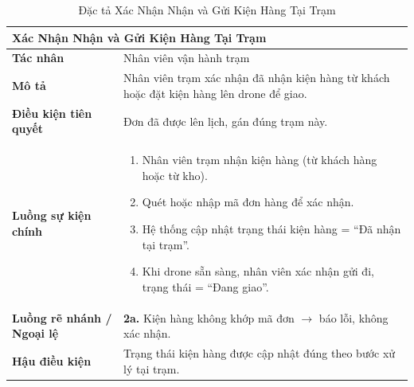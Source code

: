 \begin{table}[H]
  \centering
  \begin{tabularx}{\textwidth}{|l|X|}
    \hline
    \multicolumn{2}{|l|}{\textbf{Xác Nhận Nhận và Gửi Kiện Hàng Tại Trạm}} \\
    \hline
    \textbf{Tác nhân}           & Nhân viên vận hành trạm \\ \hline
    \textbf{Mô tả}              & Nhân viên trạm xác nhận đã nhận kiện hàng từ khách hoặc đặt kiện hàng lên drone để giao. \\ \hline
    \textbf{Điều kiện tiên quyết} & Đơn đã được lên lịch, gán đúng trạm này. \\ \hline
    \textbf{Luồng sự kiện chính} &
      \begin{enumerate}[leftmargin=*, nosep, topsep=0pt]
        \item Nhân viên trạm nhận kiện hàng (từ khách hàng hoặc từ kho).
        \item Quét hoặc nhập mã đơn hàng để xác nhận.
        \item Hệ thống cập nhật trạng thái kiện hàng = ``Đã nhận tại trạm''.
        \item Khi drone sẵn sàng, nhân viên xác nhận gửi đi, trạng thái = ``Đang giao''.
      \end{enumerate} \\ \hline
    \textbf{Luồng rẽ nhánh / Ngoại lệ} &
      \textbf{2a.} Kiện hàng không khớp mã đơn $\rightarrow$ báo lỗi, không xác nhận. \\ \hline
    \textbf{Hậu điều kiện}      & Trạng thái kiện hàng được cập nhật đúng theo bước xử lý tại trạm. \\
    \hline
  \end{tabularx}
  \caption{Đặc tả Xác Nhận Nhận và Gửi Kiện Hàng Tại Trạm}
  \label{tab:uc07}
\end{table}

